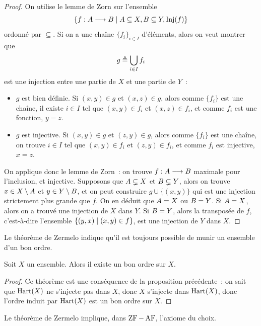 \begin{proof}
  On utilise le lemme de Zorn sur l'ensemble
  \[\left\{ f : \displaystyle A \longrightarrow B \;\middle\vert\; A \subseteq X, B \subseteq Y, \operatorname{Inj}(f) \right\}\]
  ordonné par $\subseteq$. Si on a une chaîne $\{f_i\}_{i\in I}$ d'éléments,
  alors on veut montrer que
  \[g\triangleq \bigcup_{i\in I} f_i\]
  est une injection entre une partie de $X$ et une partie de $Y$~:
  \begin{itemize}
  \item $g$ est bien définie. Si $(x,y)\in g$ et $(x,z)\in g$, alors comme
    $\{f_i\}$ est une chaîne, il existe $i\in I$ tel que $(x,y)\in f_i$ et
    $(x,z)\in f_i$, et comme $f_i$ est une fonction, $y=z$.
  \item $g$ est injective. Si $(x,y)\in g$ et $(z,y)\in g$, alors comme
    $\{f_i\}$ est une chaîne, on trouve $i\in I$ tel que $(x,y)\in f_i$ et
    $(z,y)\in f_i$, et comme $f_i$ est injective, $x=z$.
  \end{itemize}

  On applique donc le lemme de Zorn~: on trouve
  $f : \displaystyle A \longrightarrow B$ maximale pour l'inclusion, et injective.
  Supposons que $A\subsetneq X$ et $B\subsetneq Y$, alors on trouve
  $x\in X\setminus A$ et $y\in Y\setminus B$, et on peut
  construire $g\cup\{(x,y)\}$ qui est une injection strictement plus grande
  que $f$. On en déduit que $A = X$ ou $B = Y$. Si $A = X$,
  alors on a trouvé une injection de $X$ dans $Y$. Si $B = Y$, alors la
  transposée de $f$, c'est-à-dire l'ensemble $\left\{ (y,x) \;\middle\vert\; (x,y)\in f \right\}$, est
  une injection de $Y$ dans $X$.
\end{proof}

Le théorème de Zermelo indique qu'il est toujours possible de munir un ensemble
d'un bon ordre.

\begin{theorem}\label{thm.Zermelo}
  Soit $X$ un ensemble. Alors il existe un bon ordre sur $X$.
\end{theorem}

\begin{proof}
  Ce théorème est une conséquence de la proposition précédente~: on sait que
  $\operatorname{Hart}(X)$ ne s'injecte pas dans $X$, donc $X$ s'injecte dans $\operatorname{Hart}(X)$,
  donc l'ordre induit par $\operatorname{Hart}(X)$ est un bon ordre sur $X$.
\end{proof}

\begin{property}
  Le théorème de Zermelo implique, dans $\operatorname{ZF} - \operatorname{AF}$, l'axiome du choix.
\end{property}

